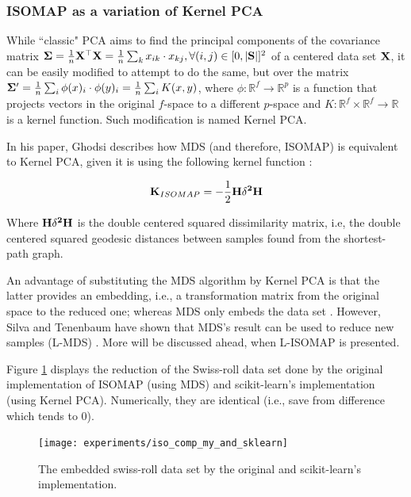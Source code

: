 \subsubsection{ISOMAP as a variation of Kernel PCA}

While ``classic" PCA aims to find the principal components of the covariance matrix $\mathbf{\Sigma} = \frac{1}{n} \mathbf{X}^\top \mathbf{X} = \frac{1}{n} \sum_k x_{ik} \cdot x_{kj}, \forall (i, j) \in [0, |\mathbf{S}|]^2$ of a centered data set $\mathbf{X}$, it can be easily modified to attempt to do the same, but over the matrix $\mathbf{\Sigma}' = \frac{1}{n} \sum_i \phi(x)_i \cdot \phi(y)_i = \frac{1}{n} \sum_i K(x, y)$, where $\phi \colon \mathbb{R}^f \to \mathbb{R}^p$ is a function that projects vectors in the original $f$-space to a different $p$-space and $K \colon \mathbb{R}^f \times \mathbb{R}^f \to \mathbb{R}$ is a kernel function. Such modification is named Kernel PCA.

In his paper, Ghodsi describes how MDS (and therefore, ISOMAP) is equivalent to Kernel PCA, given it is using the following kernel function \cite{gho2006}:

\begin{align*}
\mathbf{K}_{ISOMAP} = -\frac{1}{2}\mathbf{H \delta^2 H}
\end{align*}

Where $\mathbf{H \delta^2 H}$ is the double centered squared dissimilarity matrix, i.e, the double centered squared geodesic distances between samples found from the shortest-path graph.

An advantage of substituting the MDS algorithm by Kernel PCA is that the latter provides an embedding, i.e., a transformation matrix from the original space to the reduced one; whereas MDS only embeds the data set \cite{ham2004kernel}. However, Silva and Tenenbaum have shown that MDS's result can be used to reduce new samples (L-MDS) \cite{silva2002global}. More will be discussed ahead, when L-ISOMAP is presented.

Figure \ref{fig:comparison_oriiso_skiso} displays the reduction of the Swiss-roll data set done by the original implementation of ISOMAP (using MDS) and scikit-learn's implementation (using Kernel PCA). Numerically, they are identical (i.e., save from difference which tends to $0$).

\begin{figure}[H]
	\centering
	\texttt{[image: experiments/iso\_comp\_my\_and\_sklearn]}
	\captionsetup{justification=centering}
	\caption{The embedded swiss-roll data set by the original and scikit-learn's implementation.}
	\label{fig:comparison_oriiso_skiso}
\end{figure}

